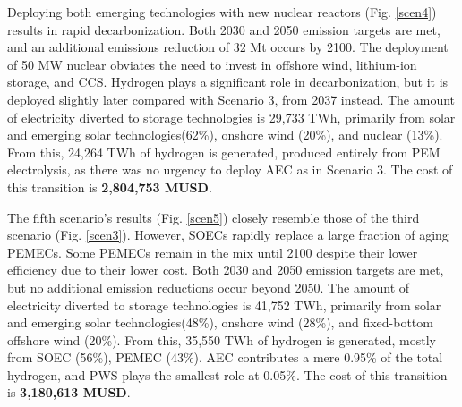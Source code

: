 Deploying both emerging technologies with new nuclear reactors (Fig. \ref{scen4}) results in rapid decarbonization. Both 2030 and 2050 emission targets are met, and an additional emissions reduction of 32 Mt occurs by 2100. The deployment of 50 MW nuclear obviates the need to invest in offshore wind, lithium-ion storage, and \gls{CCS}. Hydrogen plays a significant role in decarbonization, but it is deployed slightly later compared with Scenario 3, from 2037 instead. The amount of electricity diverted to storage technologies is 29,733 TWh, primarily from solar and emerging solar technologies(62\%), onshore wind (20\%), and nuclear (13\%). From this, 24,264 TWh of hydrogen is generated, produced entirely from PEM electrolysis, as there was no urgency to deploy \gls{AEC} as in Scenario 3. The cost of this transition is \textbf{2,804,753 MUSD}.

The fifth scenario's results (Fig. \ref{scen5}) closely resemble those of the third scenario (Fig. \ref{scen3}). However, \gls{SOEC}s rapidly replace a large fraction of aging \gls{PEMEC}s. Some \gls{PEMEC}s remain in the mix until 2100 despite their lower efficiency due to their lower cost. Both 2030 and 2050 emission targets are met, but no additional emission reductions occur beyond 2050. The amount of electricity diverted to storage technologies is 41,752 TWh, primarily from solar and emerging solar technologies(48\%), onshore wind (28\%), and fixed-bottom offshore wind (20\%). From this, 35,550 TWh of hydrogen is generated, mostly from \gls{SOEC} (56\%), \gls{PEMEC} (43\%). \gls{AEC} contributes a mere 0.95\% of the total hydrogen, and \gls{PWS} plays the smallest role at 0.05\%. The cost of this transition is \textbf{3,180,613 MUSD}.

